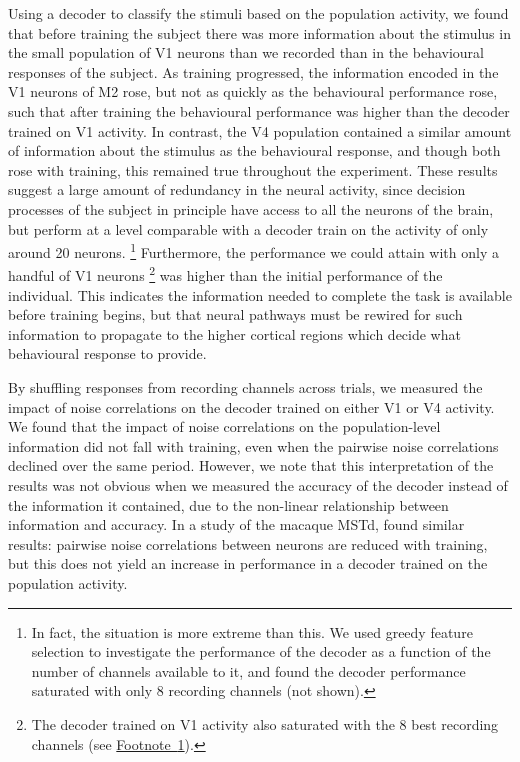 Using a decoder to classify the stimuli based on the population activity, we found that before training the subject there was more information about the stimulus in the small population of \ac{V1} neurons than we recorded than in the behavioural responses of the subject.
As training progressed, the information encoded in the \ac{V1} neurons of \ac{M2} rose, but not as quickly as the behavioural performance rose, such that after training the behavioural performance was higher than the decoder trained on \ac{V1} activity.
In contrast, the \ac{V4} population contained a similar amount of information about the stimulus as the behavioural response, and though both rose with training, this remained true throughout the experiment.
These results suggest a large amount of redundancy in the neural activity, since decision processes of the subject in principle have access to all the neurons of the brain, but perform at a level comparable with a decoder train on the activity of only around \num{20} neurons.%
\footnote{
\label{foot:pl_decoder_saturation}
In fact, the situation is more extreme than this.
We used greedy feature selection to investigate the performance of the decoder as a function of the number of channels available to it, and found the decoder performance saturated with only \num{8} recording channels (not shown).
}
Furthermore, the performance we could attain with only a handful of \ac{V1} neurons%
\footnote{
The decoder trained on \ac{V1} activity also saturated with the \num{8} best recording channels (see \hyperref[foot:pl_decoder_saturation]{Footnote~\ref{foot:pl_decoder_saturation}}).
}
was higher than the initial performance of the individual.
This indicates the information needed to complete the task is available before training begins, but that neural pathways  must be rewired for such information to propagate to the higher cortical regions which decide what behavioural response to provide.

By shuffling responses from recording channels across trials, we measured the impact of noise correlations on the decoder trained on either \ac{V1} or \ac{V4} activity.
We found that the impact of noise correlations on the population-level information did not fall with training, even when the pairwise noise correlations declined over the same period.
However, we note that this interpretation of the results was not obvious when we measured the accuracy of the decoder instead of the information it contained, due to the non-linear relationship between information and accuracy.
In a study of the macaque \ac{MSTd}, \citet{Gu2011} found similar results: pairwise noise correlations between neurons are reduced with training, but this does not yield an increase in performance in a decoder trained on the population activity.


